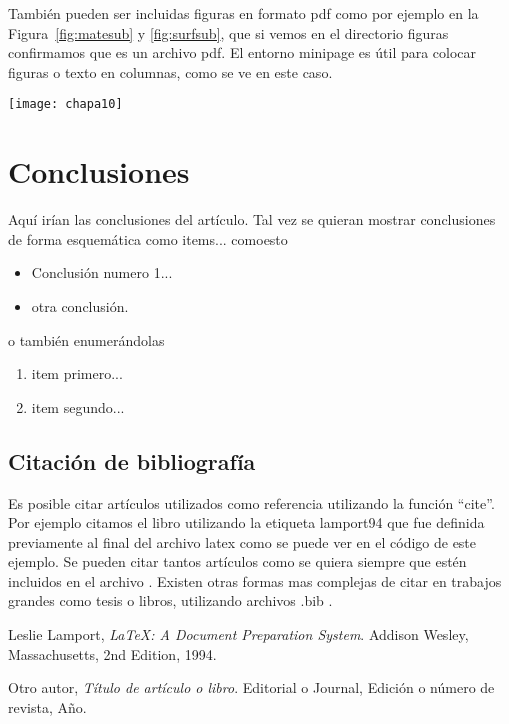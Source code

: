 \documentclass[a4paper,11pt]{article}
\begin{document}
\begin{minipage}[b]{0.45\textwidth}
También pueden ser incluidas figuras en formato pdf como por ejemplo en la Figura~\ref{fig:matesub} y \autoref{fig:surfsub}, que si vemos en el directorio figuras confirmamos que es un archivo pdf. El entorno minipage es útil para colocar figuras o texto en columnas, como se ve en este caso.  
    \end{minipage}
    \hfil
    \begin{minipage}{0.45\textwidth}
        \begin{center}
            \texttt{[image: chapa10]}
        \end{center}
    \end{minipage}





\newpage

\section{Conclusiones}
%
Aquí irían las conclusiones del artículo.  Tal vez se quieran mostrar conclusiones de forma esquemática como items... comoesto
%
\begin{itemize}
  \item Conclusión numero 1... 
  \item otra conclusión.
\end{itemize}

o también enumerándolas

\begin{enumerate}
  \item item primero...
  \item item segundo...
\end{enumerate}


\subsection{Citación de bibliografía}
%
Es posible citar artículos utilizados como referencia utilizando la función ``cite''. Por ejemplo citamos el libro \cite{lamport94} utilizando la etiqueta lamport94 que fue definida previamente al final del archivo latex como se puede ver en el código de este ejemplo. %
%
Se pueden citar tantos artículos como se quiera siempre que estén incluidos en el archivo \cite{otraetiqueta}. Existen otras formas mas complejas de citar en trabajos grandes como tesis o libros, utilizando archivos .bib . %
%


\begin{thebibliography}{15}

  Leslie Lamport,
  \emph{\LaTeX: A Document Preparation System}.
  Addison Wesley, Massachusetts,
  2nd Edition,
  1994.

  Otro autor,
  \emph{Título de artículo o libro}.
  Editorial o Journal,
  Edición o número de revista,
  Año.

\end{thebibliography}

\end{document}
